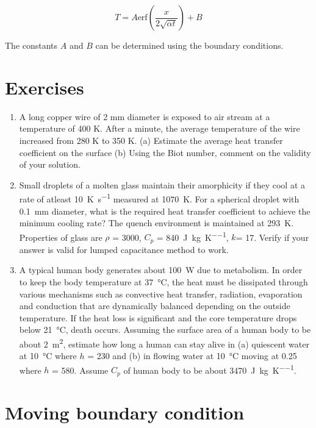 $$
\label{erfsol}
\boxed{
T = A \text{erf}(\frac{x}{2\sqrt{\alpha t}}) + B
}
$$

The constants $A$ and $B$ can be determined using the boundary conditions.


\pagebreak

\section{Exercises}

\begin{enumerate}
 \item A long copper wire of 2 mm diameter is exposed to air stream at a
temperature of 400 K. After a minute, the average temperature of the wire
increased from 280 K to 350 K. (a) Estimate the average heat transfer
coefficient on the surface (b) Using the Biot number, comment on the validity of
your solution.

\item Small droplets of a molten glass maintain their amorphicity if they cool
at a rate of atleast \SI{10}{\kelvin\per\second} measured at \SI{1070}{\kelvin}.
For a spherical droplet with \SI{0.1}{\mm} diameter, what is the required heat
transfer coefficient to achieve the minimum cooling rate? The quench environment
is maintained at \SI{293}{\kelvin}. Properties of glass are $\rho$ =
\SI{3000}{\kgpmc}, $C_p$ = \SI{840}{\joule\per\kilo\gram\per\kelvin}, $k$=
\SI{17}{\wpmk}. Verify if your answer is valid for lumped capacitance method to
work.

 \item A typical human body generates about \SI{100}{\watt} due to metabolism.
In order to keep the body temperature at \SI{37}{\celsius}, the heat must be
dissipated through various mechanisms such as convective heat transfer,
radiation, evaporation and conduction that are dynamically balanced depending on
the outside temperature. If the heat loss is significant and the core
temperature drops below \SI{21}{\celsius}, death occurs. Assuming the surface
area of a human body to be about \SI{2}{\meter\squared}, estimate how long a
human can stay alive in (a) quiescent water at \SI{10}{\celsius} where $h$ =
\SI{230}{\wpmsk} and (b) in flowing water at \SI{10}{\celsius} moving at
\SI{0.25}{\mps} where $h$ = \SI{580}{\wpmsk}. Assume $C_p$ of human body to be
about \SI{3470}{\joule\per\kilo\gram\per\kelvin}.

\end{enumerate}


\section{Moving boundary condition}

